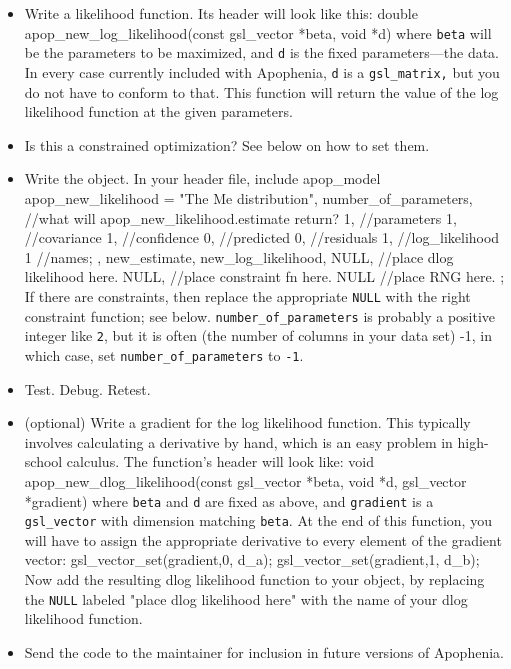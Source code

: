 \begin{itemize}
\item Write a likelihood function. Its header will look like this:
double apop_new_log_likelihood(const gsl_vector *beta, void *d)
where {\tt beta} will be the parameters to be maximized, and {\tt d} is the fixed parameters---the data. In every case currently included
with Apophenia, {\tt d} is a {\tt gsl\_\-matrix,} but you do not have to conform
to that. This function will return the value of the log likelihood function at the given parameters.

\item Is this a constrained optimization? See below on how to set them.

\item Write the object. In your header file, include 
apop_model apop_new_likelihood = {"The Me distribution", 
            number_of_parameters, 
{       //what will apop_new_likelihood.estimate return?
        1,      //parameters 
        1,      //covariance
        1,      //confidence
        0,      //predicted
        0,      //residuals
        1,      //log_likelihood
        1       //names;
},          new_estimate,
            new_log_likelihood, 
            NULL,   //place dlog likelihood here.
            NULL,   //place constraint fn here.
            NULL    //place RNG here.
            };
If there are constraints, then replace the appropriate {\tt NULL} with the right constraint function; see below.
{\tt number\_\-of\_\-parameters} is probably a positive integer like {\tt 2}, but
it is often (the number of columns in your data set) -1, in which case,
set {\tt number\_\-of\_\-parameters} to {\tt -1}.

\item Test. Debug. Retest.

\item (optional) Write a gradient for the log likelihood function. This
typically involves calculating a derivative by hand, which is an easy
problem in high-school calculus. The function's header will look like: 
void apop_new_dlog_likelihood(const gsl_vector *beta, void *d, 
                                    gsl_vector *gradient)
where {\tt beta} and {\tt d} are fixed as above, and {\tt gradient} is a {\tt gsl\_\-vector} with dimension matching {\tt beta}. 
At the end of this function, you will have to assign the appropriate derivative to every element of the gradient vector:
gsl_vector_set(gradient,0, d_a);
gsl_vector_set(gradient,1, d_b);
Now add the resulting dlog likelihood function to your object, by replacing the {\tt NULL} labeled "place dlog likelihood here" with the name of your dlog likelihood function.
\item Send the code to the maintainer for inclusion in future versions of Apophenia.
\end{itemize}


